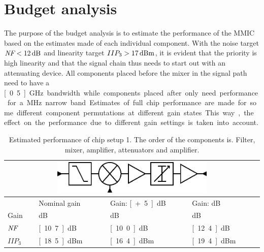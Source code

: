 	\section{Budget analysis}\label{sec:budget_analysis}
		The purpose of the budget analysis is to estimate the performance of the MMIC based on the estimates made of each individual component. With the noise target $\nf<\unit[12]{dB}$ and linearity target $IIP_3>\unit[17]{dBm}$, it is evident that the priority is high linearity and that the signal chain thus needs to start out with an attenuating device. All components placed before the mixer in the signal path need to have a \unit[0.5]{GHz} bandwidth while components placed after only need performance for a \unit[20]{MHz} narrow band. Estimates of full chip performance are made for some different component permutations at different gain states. This way, the effect on the performance due to different gain settings is taken into account.

		\begin{table}[hpt!]
			\caption[Estimated performance of chip setup 1.]{Estimated performance of chip setup 1. The order of the components is. Filter, mixer, amplifier, attenuators and amplifier.}
			\label{tab:confper1}
			\centering
			\begin{tabular}{ l l l l }
				\multicolumn{4}{c}{\includegraphics[width=0.6\textwidth]{fig/system/sys1}} \\\toprule
				& Nominal gain & Gain: \unit[+5]{dB} & Gain: \unit[-5]{dB} \\\midrule
				Gain & \unit[9]{dB} & \unit[14]{dB} & \unit[4]{dB} \\
				$\emph{NF}$ & \unit[10.7]{dB} & \unit[10.0]{dB} & \unit[12.4]{dB} \\
				$IIP_3$ & \unit[18.5]{dBm} & \unit[16.4]{dBm} & \unit[19.4]{dBm} \\\bottomrule
			\end{tabular}
		\end{table}

